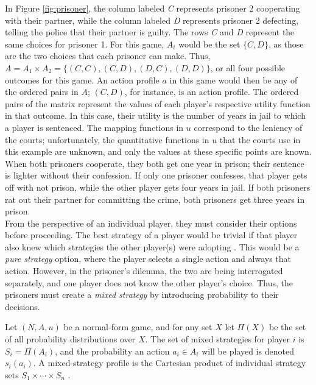 In Figure \ref{fig:prisoner}, the column labeled \textit{C} represents prisoner 2 cooperating with their partner, while the column labeled \textit{D} represents prisoner 2 defecting, telling the police that their partner is guilty. The rows \textit{C} and \textit{D} represent the same choices for prisoner 1. For this game, $A_i$ would be the set $\{C, D\}$, as those are the two choices that each prisoner can make. Thus, $A=A_1\times A_2 = \{(C, C), (C, D), (D, C), (D, D)\}$, or all four possible outcomes for this game. An action profile $a$ in this game would then be any of the ordered pairs in $A$; $(C,D)$, for instance, is an action profile. The ordered pairs of the matrix represent the values of each player's respective utility function in that outcome. In this case, their utility is the number of years in jail to which a player is sentenced. The mapping functions in $u$ correspond to the leniency of the courts; unfortunately, the quantitative functions in $u$ that the courts use in this example are unknown, and only the values at these specific points are known. When both prisoners cooperate, they both get one year in prison; their sentence is lighter without their confession. If only one prisoner confesses, that player gets off with not prison, while the other player gets four years in jail. If both prisoners rat out their partner for committing the crime, both prisoners get three years in prison.\\

From the perspective of an individual player, they must consider their options before proceeding. The best strategy of a player would be trivial if that player also knew which strategies the other player(s) were adopting \cite{shoh09}. This would be a \textit{pure strategy} option, where the player selects a single action and always that action. However, in the prisoner's dilemma, the two are being interrogated separately, and one player does not know the other player's choice. Thus, the prisoners must create a \textit{mixed strategy} by introducing probability to their decisions.

\begin{define}
  Let $(N,A,u)$ be a normal-form game, and for any set $X$ let $\Pi(X)$ be the set of all probability distributions over $X$. The set of mixed strategies for player $i$ is $S_i = \Pi(A_i)$, and the probability an action $a_i\in A_i$ will be played is denoted $s_i(a_i)$. A mixed-strategy profile is the Cartesian product of individual strategy sets $S_1\times\cdots\times S_n$ \cite{shoh09}.
\end{define}

